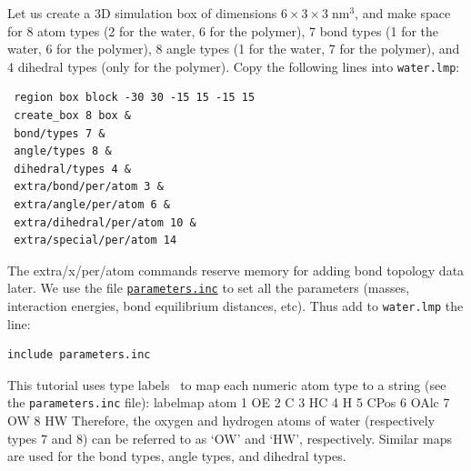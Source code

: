 \documentclass[9pt,tutorial]{livecoms}
\newcommand{\lmpcmd}[1]{\hspace{0pt}\colorbox{listing}{\textcolor{command}{\small{#1}}}\hspace{0pt}} %
\newcommand{\lmpcmdnote}[1]{\hspace{0pt}\colorbox{note_listing}{\textcolor{command}{\small{#1}}}\hspace{0pt}} %
\newcommand{\flecmd}[1]{\textcolor{command}{\texttt{#1}}} %
\newcommand{\dwlcmd}[1]{\textcolor{download}{\texttt{#1}}} %
\newcommand{\filepath}{https://raw.githubusercontent.com/lammpstutorials/lammpstutorials-article/main/files/}
\begin{document}
Let us create a 3D simulation box of dimensions $6 \times 3 \times 3 \; \text{nm}^3$,
and make space for 8 atom types (2 for the water, 6 for the polymer), 7 bond types
(1 for the water, 6 for the polymer), 8 angle types (1 for the water, 7 for the polymer),
and 4 dihedral types (only for the polymer).  Copy the following lines into \flecmd{water.lmp}:
\begin{lstlisting}
 region box block -30 30 -15 15 -15 15
 create_box 8 box &
 bond/types 7 &
 angle/types 8 &
 dihedral/types 4 &
 extra/bond/per/atom 3 &
 extra/angle/per/atom 6 &
 extra/dihedral/per/atom 10 &
 extra/special/per/atom 14
\end{lstlisting}
The \lmpcmd{extra/x/per/atom} commands reserve memory for adding bond topology
data later. We use the file \href{\filepath tutorial3/parameters.inc}{\dwlcmd{parameters.inc}}
to set all the parameters (masses, interaction energies, bond equilibrium
distances, etc).  Thus add to \flecmd{water.lmp} the line:
\begin{lstlisting}
include parameters.inc
\end{lstlisting}

\begin{note}
  This tutorial uses type labels~\cite{gissinger2024type} to map each
  numeric atom type to a string (see the \flecmd{parameters.inc} file):
  \lmpcmdnote{labelmap atom 1 OE 2 C 3 HC 4 H 5 CPos 6 OAlc 7 OW 8 HW}
  Therefore, the oxygen and hydrogen atoms of water (respectively types
  7 and 8) can be referred to as `OW' and `HW', respectively.  Similar
  maps are used for the bond types, angle types, and dihedral types.
\end{note}
\end{document}
